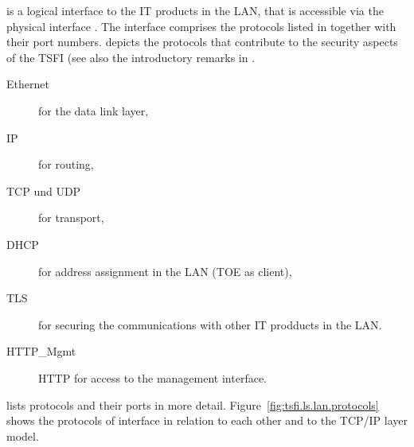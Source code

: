 


\lslan{} is a logical interface to the IT products in the LAN, that is
accessible via the physical interface . The interface comprises the
protocols listed in  together with their
port numbers.  depicts the protocols that
contribute to the security aspects of the TSFI (see also the introductory
remarks in .

\begin{description}
\item[Ethernet] for the data link layer,
\item[IP] for routing,	
\item[TCP und UDP] for transport,
\item[DHCP] for address assignment in the LAN (TOE as client),
\item[TLS] for securing the communications with other IT prodducts in the LAN.
\item[HTTP\_Mgmt] HTTP for access to the management interface.
\end{description}

 lists protocols and their ports in more
detail. Figure~\vref{fig:tsfi.ls.lan.protocols} shows the protocols of interface
\lslan{} in relation to each other and to the TCP/IP layer model.

\afterpage{%
  \clearpage%
  \begin{landscape}%
    \centering %
    {
      
    }
  \end{landscape}
  \clearpage%
}

